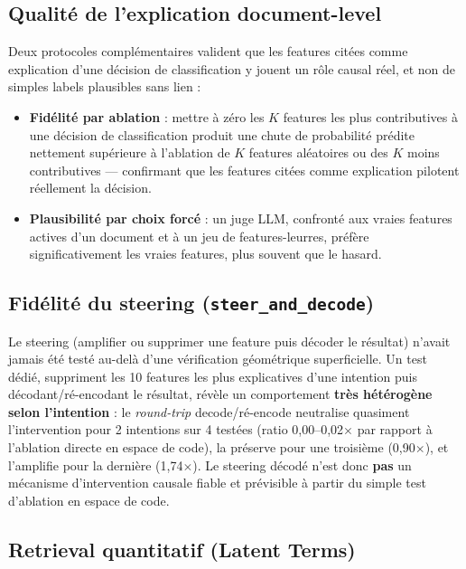 \documentclass[11pt]{article}
\begin{document}
\subsection{Qualité de l'explication document-level}

Deux protocoles complémentaires valident que les features citées comme
explication d'une décision de classification y jouent un rôle causal réel,
et non de simples labels plausibles sans lien :

\begin{itemize}
  \item \textbf{Fidélité par ablation} : mettre à zéro les $K$ features les
    plus contributives à une décision de classification produit une chute de
    probabilité prédite nettement supérieure à l'ablation de $K$ features
    aléatoires ou des $K$ moins contributives --- confirmant que les features
    citées comme explication pilotent réellement la décision.
  \item \textbf{Plausibilité par choix forcé} : un juge LLM, confronté aux
    vraies features actives d'un document et à un jeu de features-leurres,
    préfère significativement les vraies features, plus souvent que le
    hasard.
\end{itemize}

\subsection{Fidélité du steering (\texttt{steer\_and\_decode})}

Le steering (amplifier ou supprimer une feature puis décoder le résultat)
n'avait jamais été testé au-delà d'une vérification géométrique superficielle.
Un test dédié, suppriment les 10 features les plus explicatives d'une
intention puis décodant/ré-encodant le résultat, révèle un comportement
\textbf{très hétérogène selon l'intention} : le \emph{round-trip}
decode/ré-encode neutralise quasiment l'intervention pour 2 intentions sur 4
testées (ratio 0,00--0,02$\times$ par rapport à l'ablation directe en espace de
code), la préserve pour une troisième (0,90$\times$), et l'amplifie pour la
dernière (1,74$\times$). Le steering décodé n'est donc \textbf{pas} un
mécanisme d'intervention causale fiable et prévisible à partir du simple test
d'ablation en espace de code.

\subsection{Retrieval quantitatif (Latent Terms)}
\end{document}
